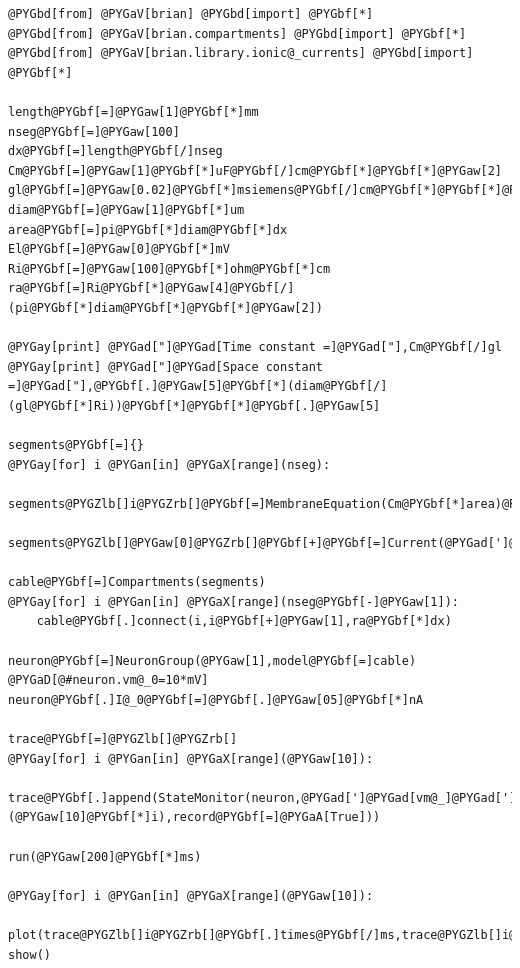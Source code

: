 \documentclass[letterpaper,10pt,english]{manual}
\begin{document}
\begin{Verbatim}[commandchars=@\[\]]
@PYGbd[from] @PYGaV[brian] @PYGbd[import] @PYGbf[*]
@PYGbd[from] @PYGaV[brian.compartments] @PYGbd[import] @PYGbf[*]
@PYGbd[from] @PYGaV[brian.library.ionic@_currents] @PYGbd[import] @PYGbf[*]

length@PYGbf[=]@PYGaw[1]@PYGbf[*]mm
nseg@PYGbf[=]@PYGaw[100]
dx@PYGbf[=]length@PYGbf[/]nseg
Cm@PYGbf[=]@PYGaw[1]@PYGbf[*]uF@PYGbf[/]cm@PYGbf[*]@PYGbf[*]@PYGaw[2]
gl@PYGbf[=]@PYGaw[0.02]@PYGbf[*]msiemens@PYGbf[/]cm@PYGbf[*]@PYGbf[*]@PYGaw[2]
diam@PYGbf[=]@PYGaw[1]@PYGbf[*]um
area@PYGbf[=]pi@PYGbf[*]diam@PYGbf[*]dx
El@PYGbf[=]@PYGaw[0]@PYGbf[*]mV
Ri@PYGbf[=]@PYGaw[100]@PYGbf[*]ohm@PYGbf[*]cm
ra@PYGbf[=]Ri@PYGbf[*]@PYGaw[4]@PYGbf[/](pi@PYGbf[*]diam@PYGbf[*]@PYGbf[*]@PYGaw[2])

@PYGay[print] @PYGad["]@PYGad[Time constant =]@PYGad["],Cm@PYGbf[/]gl
@PYGay[print] @PYGad["]@PYGad[Space constant =]@PYGad["],@PYGbf[.]@PYGaw[5]@PYGbf[*](diam@PYGbf[/](gl@PYGbf[*]Ri))@PYGbf[*]@PYGbf[*]@PYGbf[.]@PYGaw[5]

segments@PYGbf[=]{}
@PYGay[for] i @PYGan[in] @PYGaX[range](nseg):
    segments@PYGZlb[]i@PYGZrb[]@PYGbf[=]MembraneEquation(Cm@PYGbf[*]area)@PYGbf[+]leak@_current(gl@PYGbf[*]area,El)

segments@PYGZlb[]@PYGaw[0]@PYGZrb[]@PYGbf[+]@PYGbf[=]Current(@PYGad[']@PYGad[I:nA]@PYGad['])

cable@PYGbf[=]Compartments(segments)
@PYGay[for] i @PYGan[in] @PYGaX[range](nseg@PYGbf[-]@PYGaw[1]):
    cable@PYGbf[.]connect(i,i@PYGbf[+]@PYGaw[1],ra@PYGbf[*]dx)

neuron@PYGbf[=]NeuronGroup(@PYGaw[1],model@PYGbf[=]cable)
@PYGaD[@#neuron.vm@_0=10*mV]
neuron@PYGbf[.]I@_0@PYGbf[=]@PYGbf[.]@PYGaw[05]@PYGbf[*]nA

trace@PYGbf[=]@PYGZlb[]@PYGZrb[]
@PYGay[for] i @PYGan[in] @PYGaX[range](@PYGaw[10]):
    trace@PYGbf[.]append(StateMonitor(neuron,@PYGad[']@PYGad[vm@_]@PYGad[']@PYGbf[+]@PYGaX[str](@PYGaw[10]@PYGbf[*]i),record@PYGbf[=]@PYGaA[True]))

run(@PYGaw[200]@PYGbf[*]ms)

@PYGay[for] i @PYGan[in] @PYGaX[range](@PYGaw[10]):
    plot(trace@PYGZlb[]i@PYGZrb[]@PYGbf[.]times@PYGbf[/]ms,trace@PYGZlb[]i@PYGZrb[]@PYGZlb[]@PYGaw[0]@PYGZrb[]@PYGbf[/]mV)
show()
\end{Verbatim}

\resetcurrentobjects
\hypertarget{--doc-examples-misc_COBA}{}
\end{document}
